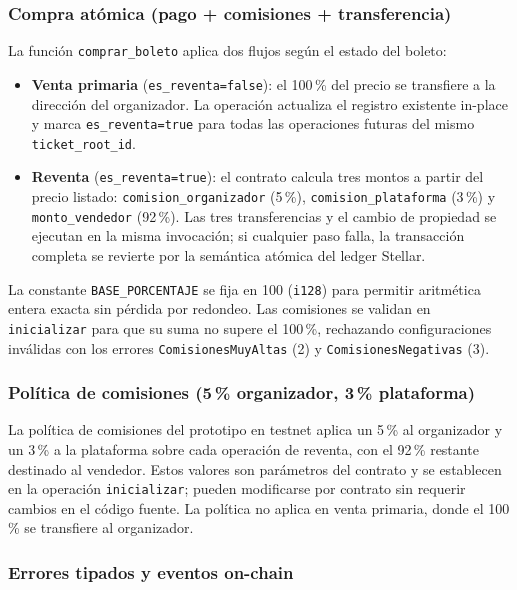 \subsubsection{Compra atómica (pago + comisiones + transferencia)}

La función \texttt{comprar\_boleto} aplica dos flujos según el estado del boleto:

\begin{itemize}
    \item \textbf{Venta primaria} (\texttt{es\_reventa=false}): el 100\,\% del precio se transfiere a la dirección del organizador. La operación actualiza el registro existente in-place y marca \texttt{es\_reventa=true} para todas las operaciones futuras del mismo \texttt{ticket\_root\_id}.
    \item \textbf{Reventa} (\texttt{es\_reventa=true}): el contrato calcula tres montos a partir del precio listado: \texttt{comision\_organizador} (5\,\%), \texttt{comision\_plataforma} (3\,\%) y \texttt{monto\_vendedor} (92\,\%). Las tres transferencias y el cambio de propiedad se ejecutan en la misma invocación; si cualquier paso falla, la transacción completa se revierte por la semántica atómica del ledger Stellar.
\end{itemize}

La constante \texttt{BASE\_PORCENTAJE} se fija en 100 (\texttt{i128}) para permitir aritmética entera exacta sin pérdida por redondeo. Las comisiones se validan en \texttt{inicializar} para que su suma no supere el 100\,\%, rechazando configuraciones inválidas con los errores \texttt{ComisionesMuyAltas} (2) y \texttt{ComisionesNegativas} (3).

\subsubsection{Política de comisiones (5\,\% organizador, 3\,\% plataforma)}

La política de comisiones del prototipo en testnet aplica un 5\,\% al organizador y un 3\,\% a la plataforma sobre cada operación de reventa, con el 92\,\% restante destinado al vendedor. Estos valores son parámetros del contrato y se establecen en la operación \texttt{inicializar}; pueden modificarse por contrato sin requerir cambios en el código fuente. La política no aplica en venta primaria, donde el 100\,\% se transfiere al organizador.

\subsubsection{Errores tipados y eventos on-chain}


